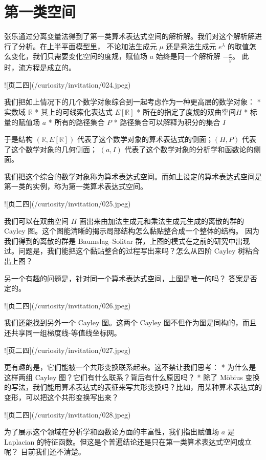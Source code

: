 \documentclass[a4paper,12pt]{book}
\numberwithin{problem}{section}
\numberwithin{definition}{section}
\numberwithin{lemma}{section}
\numberwithin{proposition}{section}
\numberwithin{theorem}{section}
\numberwithin{grammar}{section}
\numberwithin{program}{section}
\numberwithin{convention}{section}
\numberwithin{corollary}{section}
\begin{document}
\newpage

\chapter{第一类空间}

张乐通过分离变量法得到了第一类算术表达式空间的解析解。我们对这个解析解进行了分析。在上半平面模型里，
不论加法生成元 $\mu$ 还是乘法生成元 $e^\lambda$ 的取值怎么变化，我们只需要变化空间的度规，赋值场 $a$ 始终是同一个解析解 $-\frac{x}{y}$。
此时，流方程是成立的。

![页二四](/curiosity/invitation/024.jpeg)

我们把如上情况下的几个数学对象综合到一起考虑作为一种更高层的数学对象：
* 实数域 $\mathbb{R}$
* 其上的可线索化表达式 $E[\mathbb{R}]$
* 所在的指定了度规的双曲空间$H$
* 标量的赋值场 $a$
* 所有的路径集合 $P$
* 路径集合可以解释为积分的集合 $I$

于是结构 $(\mathbb{R}, E[\mathbb{R}])$ 代表了这个数学对象的算术表达式的侧面；$(H, P)$ 代表了这个数学对象的几何侧面；
$(a, I)$ 代表了这个数学对象的分析学和函数论的侧面。

我们把这个综合的数学对象称为算术表达式空间。而如上设定的算术表达式空间是第一类的实例，称为第一类算术表达式空间。

![页二四](/curiosity/invitation/025.jpeg)

我们可以在双曲空间 $H$ 画出来由加法生成元和乘法生成元生成的离散的群的 Cayley 图。这个图能清晰的揭示局部结构怎么黏贴整合成一个整体的结构。
因为我们得到的离散的群是 Baumslag–Solitar 群，上图的模式在之前的研究中出现过。问题是，我们能把这个黏贴整合的过程写出来吗？怎么从四阶 Cayley 树粘合出上图？

另一个有趣的问题是，针对同一个算术表达式空间，上图是唯一的吗？ 答案是否定的。

![页二四](/curiosity/invitation/026.jpeg)

我们还能找到另外一个 Cayley 图。这两个 Cayley 图不但作为图是同构的，而且还共享同一组梯度线-等值线坐标网。

![页二四](/curiosity/invitation/027.jpeg)

更有趣的是，它们能被一个共形变换联系起来。这不禁让我们思考：
* 为什么是这样两组 Cayley 图？它们有什么联系？背后有什么原因吗？
* 除了 Möbius 变换的写法，我们能用算术表达式的表征来写共形变换吗？比如，用某种算术表达式的变形，可以把这个共形变换写出来？

![页二四](/curiosity/invitation/028.jpeg)

为了展示这个领域在分析学和函数论方面的丰富性，我们指出赋值场 $a$ 是 Laplacian 的特征函数。但这是个普遍结论还是只在第一类算术表达式空间成立呢？
目前我们还不清楚。
\end{document}
